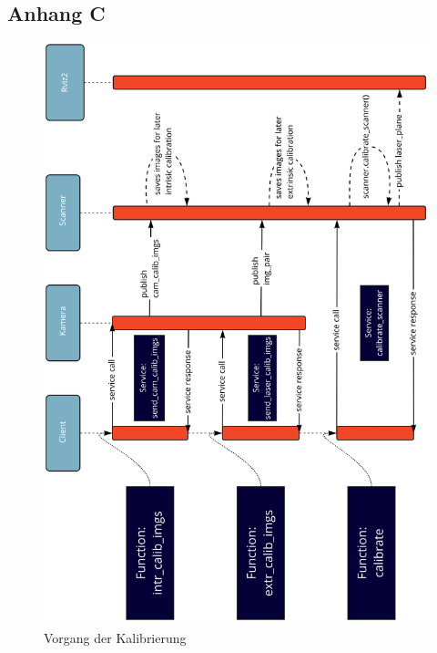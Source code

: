 \documentclass[	12pt,
				a4paper,
				bibliography=totoc,
				listof=totoc,
				index=totoc,
				twoside,
				headsepline,
				footsepline,
				ngerman]{scrartcl}
\begin{document}
\begin{appendix}
		\subsection{Anhang C}\label{anhang-c}
			\begin{figure}[h!]
				\centering
				\includegraphics[width=0.75\linewidth]{img/anhang/vorgang_kalibrierung.jpg}
				\caption{Vorgang der Kalibrierung}
				\label{fig:vorgang_kalibrierung}
			\end{figure}
		\newpage

\end{appendix}
\end{document}
